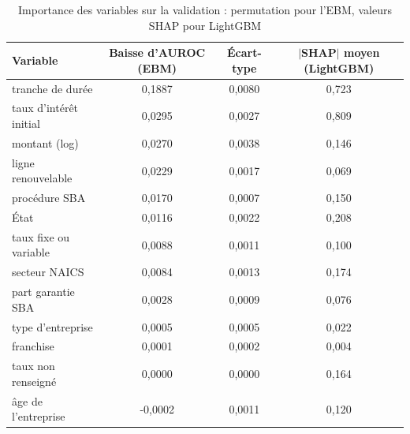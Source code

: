\begin{table}[htbp]
\centering
\footnotesize\setlength{\tabcolsep}{4pt}
\caption{Importance des variables sur la validation : permutation pour l'EBM, valeurs SHAP pour LightGBM}\label{tab:importance}
\begin{tabular}{lccc}
\toprule
Variable & Baisse d'AUROC (EBM) & Écart-type & $|$SHAP$|$ moyen (LightGBM) \\
\midrule
tranche de durée & 0,1887 & 0,0080 & 0,723 \\
taux d'intérêt initial & 0,0295 & 0,0027 & 0,809 \\
montant (log) & 0,0270 & 0,0038 & 0,146 \\
ligne renouvelable & 0,0229 & 0,0017 & 0,069 \\
procédure SBA & 0,0170 & 0,0007 & 0,150 \\
État & 0,0116 & 0,0022 & 0,208 \\
taux fixe ou variable & 0,0088 & 0,0011 & 0,100 \\
secteur NAICS & 0,0084 & 0,0013 & 0,174 \\
part garantie SBA & 0,0028 & 0,0009 & 0,076 \\
type d'entreprise & 0,0005 & 0,0005 & 0,022 \\
franchise & 0,0001 & 0,0002 & 0,004 \\
taux non renseigné & 0,0000 & 0,0000 & 0,164 \\
âge de l'entreprise & -0,0002 & 0,0011 & 0,120 \\
\bottomrule
\end{tabular}
\end{table}
